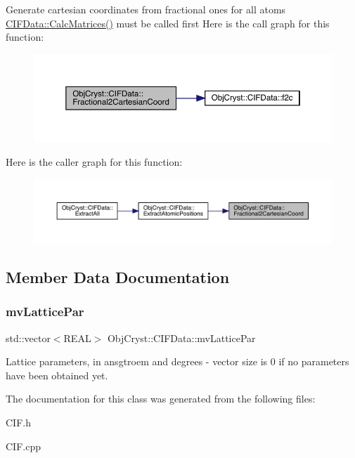 Generate cartesian coordinates from fractional ones for all atoms \mbox{\hyperlink{class_obj_cryst_1_1_c_i_f_data_a51e099b2881e73eb776855177aed4ca9}{C\+I\+F\+Data\+::\+Calc\+Matrices()}} must be called first Here is the call graph for this function\+:
\nopagebreak
\begin{figure}[H]
\begin{center}
\leavevmode
\includegraphics[width=350pt]{class_obj_cryst_1_1_c_i_f_data_a8217fa94ba5f6291b566d43123162d9c_cgraph}
\end{center}
\end{figure}
Here is the caller graph for this function\+:
\nopagebreak
\begin{figure}[H]
\begin{center}
\leavevmode
\includegraphics[width=350pt]{class_obj_cryst_1_1_c_i_f_data_a8217fa94ba5f6291b566d43123162d9c_icgraph}
\end{center}
\end{figure}


\subsection{Member Data Documentation}
\mbox{\label{class_obj_cryst_1_1_c_i_f_data_abefa76784381b2b13a9e1ec4abaa7944}} 
\subsubsection{\texorpdfstring{mvLatticePar}{mvLatticePar}}
{\footnotesize\ttfamily std\+::vector$<$R\+E\+AL$>$ Obj\+Cryst\+::\+C\+I\+F\+Data\+::mv\+Lattice\+Par}

Lattice parameters, in ansgtroem and degrees -\/ vector size is 0 if no parameters have been obtained yet. 

The documentation for this class was generated from the following files\+:\begin{DoxyCompactItemize}
\item 
C\+I\+F.\+h\item 
C\+I\+F.\+cpp\end{DoxyCompactItemize}
